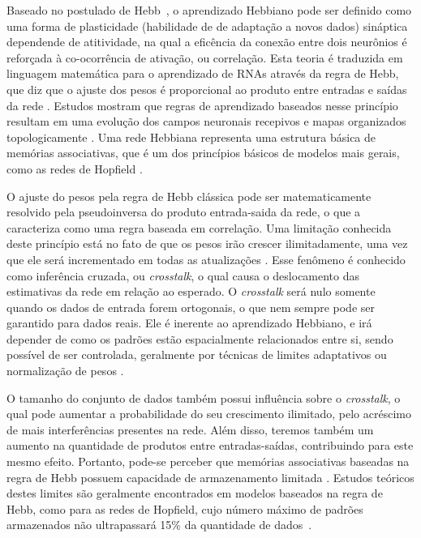 \documentclass[conference]{IEEEtran}
\begin{document}
	Baseado no postulado de Hebb~\cite{hebb1949organization}, o aprendizado Hebbiano pode ser definido como uma forma de plasticidade (habilidade de de adaptação a novos dados) sináptica dependende de atitividade, na qual a eficência da conexão entre dois neurônios é reforçada à co-ocorrência de ativação, ou correlação. Esta teoria é traduzida em linguagem matemática para o aprendizado de RNAs através da regra de Hebb, que diz que o ajuste dos pesos é proporcional ao produto entre entradas e saídas da rede \cite{gerstner2002mathematical}. Estudos mostram que regras de aprendizado baseados nesse princípio resultam em uma evolução dos campos neuronais recepivos e mapas organizados topologicamente \cite{kempter1999hebbian}. Uma rede Hebbiana representa uma estrutura básica de memórias associativas, que é um dos princípios básicos de modelos mais gerais, como as redes de Hopfield \cite{hopfield1982neural}.
		
	O ajuste do pesos pela regra de Hebb clássica pode ser matematicamente resolvido pela pseudoinversa do produto entrada-saida da rede, o que a caracteriza como uma regra baseada em correlação. Uma limitação conhecida deste princípio está no fato de que os pesos irão crescer ilimitadamente, uma vez que ele será incrementado em todas as atualizações \cite{choe2013hebbian}. Esse fenômeno é conhecido como inferência cruzada, ou \textit{crosstalk}, o qual causa o deslocamento das estimativas da rede em relação ao esperado. O \textit{crosstalk} será nulo somente quando os dados de entrada forem ortogonais, o que nem sempre pode ser garantido para dados reais. Ele é inerente ao aprendizado Hebbiano, e irá depender de como os padrões estão espacialmente relacionados entre si, sendo possível de ser controlada, geralmente por técnicas de limites adaptativos \cite{bienenstock1982theory} ou normalização de pesos \cite{miller1994role}.
	
	O tamanho do conjunto de dados também possui influência sobre o \textit{crosstalk}, o qual pode aumentar a probabilidade do seu crescimento ilimitado, pelo acréscimo de mais interferências presentes na rede. Além disso, teremos também um aumento na quantidade de produtos entre entradas-saídas, contribuindo para este mesmo efeito. Portanto, pode-se perceber que memórias associativas baseadas na regra de Hebb possuem capacidade de armazenamento limitada \cite{jain1996artificial}. Estudos teóricos destes limites são geralmente encontrados em modelos baseados na regra de Hebb, como para as redes de Hopfield, cujo número máximo de padrões armazenados não ultrapassará 15\% da quantidade de dados~\cite{mceliece1987capacity}.
	
\end{document}

